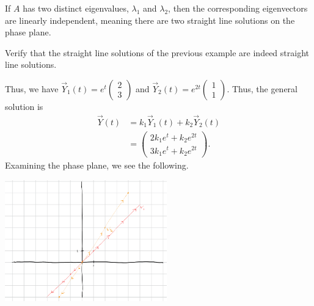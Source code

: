 \documentclass[10pt]{mypackage}
\begin{document}
\begin{example}
\begin{definition}
  If $A$ has two distinct eigenvalues, $\lambda_1$ and $\lambda_2$, then the corresponding eigenvectors are linearly independent, meaning there are two straight line solutions on the phase plane.
\end{definition}
\begin{exercise}
  Verify that the straight line solutions of the previous example are indeed straight line solutions.
\end{exercise}
Thus, we have $\vec{Y}_1(t) = e^{t} \begin{pmatrix}2\\3\end{pmatrix}$ and $\vec{Y}_2(t) = e^{2t} \begin{pmatrix}1\\1\end{pmatrix}$. Thus, the general solution is
\begin{align*}
  \vec{Y}(t) &= k_1\vec{Y}_1(t) + k_2\vec{Y}_2(t)\\
             &= \begin{pmatrix}2k_1e^{t} + k_2e^{2t}\\ 3k_1e^{t} + k_2e^{2t}\end{pmatrix}.
\end{align*}
Examining the phase plane, we see the following.
\begin{center}
  \includegraphics[width=7cm]{images/straight_line_2.png}
\end{center}
\end{example}
\end{document}
